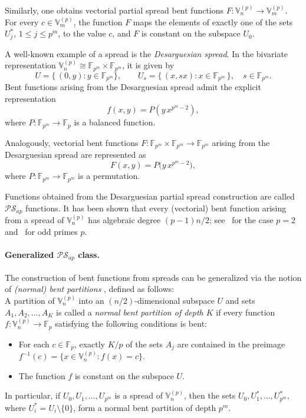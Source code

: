 \documentclass[12pt]{article}
\theoremstyle{plain}
\theoremstyle{definition}
\newcommand{\V}{\mathbb{V}}
\renewcommand{\to}{\rightarrow}
\begin{document}
	Similarly, one obtains vectorial partial spread bent functions
	\( F : \V_n^{(p)} \to \V_m^{(p)} \).
	For every \( c \in \V_m^{(p)} \), the function \( F \) maps the elements of
	exactly one of the sets \( U_j^{\ast} \), \( 1 \le j \le p^{m} \), to the value
	\( c \), and \( F \) is constant on the subspace \( U_0 \).
	
	A well-known example of a spread is the \emph{Desarguesian spread}.
	In the bivariate representation
	\(\V_n^{(p)} \cong \mathbb{F}_{p^m} \times \mathbb{F}_{p^m}\),
	it is given by
	\[
	U = \{\, (0,y) : y \in \mathbb{F}_{p^m} \},
	\qquad
	U_s = \{\, (x,sx) : x \in \mathbb{F}_{p^m} \,\},
	\quad s \in \mathbb{F}_{p^m}.
	\]
	Bent functions arising from the Desarguesian spread admit the explicit
	representation
	\begin{equation}\label{eq:PSap}
		f(x,y) = P\!\left(y\,x^{p^{m}-2}\right),
	\end{equation}
	where
	\(P \colon \mathbb{F}_{p^m} \to \mathbb{F}_p\)
	is a balanced function.
	
	Analogously, vectorial bent functions
	\(F \colon \mathbb{F}_{p^{m}} \times \mathbb{F}_{p^{m}} \to \mathbb{F}_{p^{m}}\)
	arising from the Desarguesian spread are represented as
	\[
	F(x,y) = P\bigl(y\,x^{p^{m}-2}\bigr),
	\]
	where
	\(P \colon \mathbb{F}_{p^{m}} \to \mathbb{F}_{p^{m}}\)
	is a permutation.
	
	Functions obtained from the Desarguesian partial spread construction are called 
	\(\mathcal{PS}_{ap}\) functions.
	It has been shown that every (vectorial) bent function arising from a spread of 
	\(\V_n^{(p)}\) has algebraic degree \((p-1)n/2\); 
	see~\cite{dillon} for the case \(p = 2\) and~\cite{nuwi22} for odd primes \(p\).
	
	\paragraph{Generalized \(\mathcal{PS}_{ap}\) class.}
	The construction of bent functions from spreads can be generalized via the
	notion of \emph{(normal) bent partitions} \cite{nuwi22}, defined as follows:\\
	A partition of \(\V_n^{(p)}\) into an \((n/2)\)-dimensional subspace \(U\) and
	sets \(A_1, A_2, \dots, A_K\) is called a
	\emph{normal bent partition of depth \(K\)} if every function
	\(f :\V_n^{(p)} \to \mathbb{F}_p\) satisfying the following conditions is bent:
	\begin{itemize}
		\item[(i)] For each \(c \in \mathbb{F}_p\), exactly \(K/p\) of the sets
		\(A_j\) are contained in the preimage \(f^{-1}(c)=\{x\in \V_n^{(p)} : f(x)=c\}\).
		\item[(ii)] The function \(f\) is constant on the subspace \(U\).
	\end{itemize}
	In particular, if \(U_0, U_1, \dots, U_{p^m}\) is a spread of \(\V_n^{(p)}\),
	then the sets \(U_0, U_1^{\ast}, \dots, U_{p^m}^{\ast}\), where
	\(U_i^{\ast} = U_i \setminus \{0\}\), form a normal bent partition of depth
	\(p^m\).
	
\end{document}
